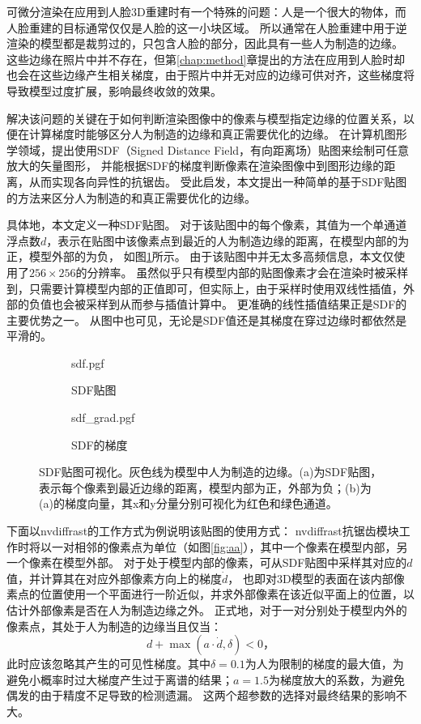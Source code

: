 可微分渲染在应用到人脸3D重建时有一个特殊的问题：人是一个很大的物体，而人脸重建的目标通常仅仅是人脸的这一小块区域。
所以通常在人脸重建中用于逆渲染的模型都是裁剪过的，只包含人脸的部分，因此具有一些人为制造的边缘。
这些边缘在照片中并不存在，但第\ref{chap:method}章提出的方法在应用到人脸时却也会在这些边缘产生相关梯度，由于照片中并无对应的边缘可供对齐，这些梯度将导致模型过度扩展，影响最终收敛的效果。

解决该问题的关键在于如何判断渲染图像中的像素与模型指定边缘的位置关系，以便在计算梯度时能够区分人为制造的边缘和真正需要优化的边缘。
在计算机图形学领域，\citet{sdf_glyphs}提出使用SDF（Signed Distance Field，有向距离场）贴图来绘制可任意放大的矢量图形，
并能根据SDF的梯度判断像素在渲染图像中到图形边缘的距离，从而实现各向异性的抗锯齿。
受此启发，本文提出一种简单的基于SDF贴图的方法来区分人为制造的和真正需要优化的边缘。

具体地，本文定义一种SDF贴图。
对于该贴图中的每个像素，其值为一个单通道浮点数$d$，表示在贴图中该像素点到最近的人为制造边缘的距离，在模型内部的为正，模型外部的为负，
如图\ref{fig:sdf}所示。
由于该贴图中并无太多高频信息，本文仅使用了$256 \times 256$的分辨率。
虽然似乎只有模型内部的贴图像素才会在渲染时被采样到，只需要计算模型内部的正值即可，但实际上，由于采样时使用双线性插值，外部的负值也会被采样到从而参与插值计算中。
更准确的线性插值结果正是SDF的主要优势之一。
从图中也可见，无论是SDF值还是其梯度在穿过边缘时都依然是平滑的。

\begin{figure}
\centering
\begin{subfigure}[t]{3.3in}
    \centering
    {sdf.pgf}
    \caption{SDF贴图}
    \label{fig:sdf}
\end{subfigure}
\begin{subfigure}[t]{2.9in}
    \centering
    {sdf_grad.pgf}
    \caption{SDF的梯度}
    \label{fig:sdf_grad}
\end{subfigure}
\caption[SDF贴图可视化]{SDF贴图可视化。灰色线为模型中人为制造的边缘。(a)为SDF贴图，表示每个像素到最近边缘的距离，模型内部为正，外部为负；(b)为(a)的梯度向量，其x和y分量分别可视化为红色和绿色通道。}
\end{figure}

下面以nvdiffrast的工作方式为例说明该贴图的使用方式：
nvdiffrast抗锯齿模块工作时将以一对相邻的像素点为单位（如图\ref{fig:aa}），其中一个像素在模型内部，另一个像素在模型外部。
\def\dgrad{\dot d}
对于处于模型内部的像素，可从SDF贴图中采样其对应的$d$值，并计算其在对应外部像素方向上的梯度$\dgrad$，
也即对3D模型的表面在该内部像素点的位置使用一个平面进行一阶近似，并求外部像素在该近似平面上的位置，以估计外部像素是否在人为制造边缘之外。
正式地，对于一对分别处于模型内外的像素点，其处于人为制造的边缘当且仅当：
\begin{equation}
    d + \max\left(a\cdot \dgrad, \delta\right) < 0
    \text{，}
\end{equation}
此时应该忽略其产生的可见性梯度。其中$\delta=0.1$为人为限制的梯度的最大值，为避免小概率时过大梯度产生过于离谱的结果；$a=1.5$为梯度放大的系数，为避免偶发的由于精度不足导致的检测遗漏。
这两个超参数的选择对最终结果的影响不大。

